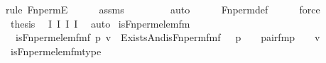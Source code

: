 \begin{isabellebody}
{\isacharparenleft}{\kern0pt}rule\ Fn{\isacharunderscore}{\kern0pt}permE{\isacharparenright}{\kern0pt}\isanewline
\ \ \ \ \isamarkupfalse%
\ assms\isanewline
\ \ \ \ \ \ \ \isamarkupfalse%
\ auto{\isacharbrackleft}{\kern0pt}{}{\isacharbrackright}{\kern0pt}\isanewline
\ \ \ \ \isamarkupfalse%
\ Fn{\isacharunderscore}{\kern0pt}perm{\isacharunderscore}{\kern0pt}def\isanewline
\ \ \ \ \isamarkupfalse%
\ force\ \isanewline
\ \ \ \ \isamarkupfalse%
\isanewline
\ \ \isamarkupfalse%
\ {\isacharquery}{\kern0pt}thesis\ \isamarkupfalse%
\ I{}\ I{}\ I{}\ I{}\ \isamarkupfalse%
\ auto\isanewline
{}\isamarkupfalse%
%
\endisatagproof
{\isafoldproof}%
%
\isadelimproof
\isanewline
%
\endisadelimproof
\isanewline
{}\isamarkupfalse%
\ is{\isacharunderscore}{\kern0pt}Fn{\isacharunderscore}{\kern0pt}perm{\isacharprime}{\kern0pt}{\isacharunderscore}{\kern0pt}elem{\isacharunderscore}{\kern0pt}fm\ \ \isanewline
\ \ {\isachardoublequoteopen}is{\isacharunderscore}{\kern0pt}Fn{\isacharunderscore}{\kern0pt}perm{\isacharprime}{\kern0pt}{\isacharunderscore}{\kern0pt}elem{\isacharunderscore}{\kern0pt}fm{\isacharparenleft}{\kern0pt}f{\isacharcomma}{\kern0pt}\ p{\isacharcomma}{\kern0pt}\ v{\isacharparenright}{\kern0pt}\ {\isasymequiv}\ Exists{\isacharparenleft}{\kern0pt}And{\isacharparenleft}{\kern0pt}is{\isacharunderscore}{\kern0pt}Fn{\isacharunderscore}{\kern0pt}perm{\isacharunderscore}{\kern0pt}fm{\isacharparenleft}{\kern0pt}f\ {\isacharhash}{\kern0pt}{\isacharplus}{\kern0pt}\ {}{\isacharcomma}{\kern0pt}\ p\ {\isacharhash}{\kern0pt}{\isacharplus}{\kern0pt}\ {}{\isacharcomma}{\kern0pt}\ {}{\isacharparenright}{\kern0pt}{\isacharcomma}{\kern0pt}\ pair{\isacharunderscore}{\kern0pt}fm{\isacharparenleft}{\kern0pt}p\ {\isacharhash}{\kern0pt}{\isacharplus}{\kern0pt}\ {}{\isacharcomma}{\kern0pt}\ {}{\isacharcomma}{\kern0pt}\ v\ {\isacharhash}{\kern0pt}{\isacharplus}{\kern0pt}\ {}{\isacharparenright}{\kern0pt}{\isacharparenright}{\kern0pt}{\isacharparenright}{\kern0pt}{\isachardoublequoteclose}\isanewline
\isanewline
{}\isamarkupfalse%
\ is{\isacharunderscore}{\kern0pt}Fn{\isacharunderscore}{\kern0pt}perm{\isacharprime}{\kern0pt}{\isacharunderscore}{\kern0pt}elem{\isacharunderscore}{\kern0pt}fm{\isacharunderscore}{\kern0pt}type{\isacharcolon}{\kern0pt}\ \isanewline

\end{isabellebody}
